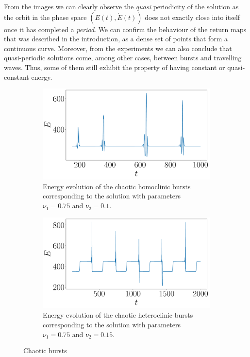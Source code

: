 \documentclass[twoside]{article}
\begin{document}
From the images we can clearly observe the \emph{quasi} periodicity of the solution as the orbit in the phase space $(E(t), \dot{E}(t))$ does not exactly close into itself once it has completed a \emph{period}. We can confirm the behaviour of the return maps that was described in the introduction, as a dense set of points that form a continuous curve. Moreover, from the experiments we can also conclude that quasi-periodic solutions come, among other cases, between bursts and travelling waves. Thus, some of them still exhibit the property of having constant or quasi-constant energy.

\begin{figure}[ht]
  \centering
  \begin{subfigure}[ht]{0.45\textwidth}
    \includegraphics[width=\textwidth]{images/homo_chaotic.pdf}
    \caption{Energy evolution of the chaotic homoclinic bursts corresponding to the solution with parameters $\nu_1=0.75$ and $\nu_2=0.1$.}
  \end{subfigure}\hspace{0.033333\textwidth}
  \begin{subfigure}[ht]{0.45\textwidth}
    \includegraphics[width=\textwidth]{images/hetero_chaotic.pdf}
    \caption{Energy evolution of the chaotic heteroclinic bursts corresponding to the solution with parameters $\nu_1=0.75$ and $\nu_2=0.15$.}
  \end{subfigure}
  \caption{Chaotic bursts}
  \label{fig:chaotic_burst}
\end{figure}
\end{document}

